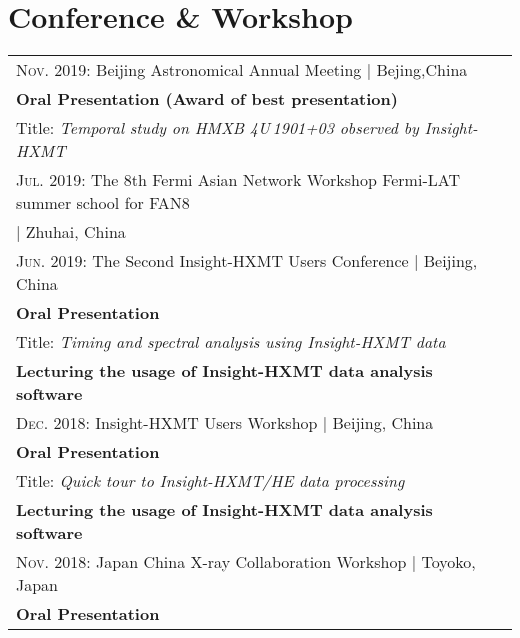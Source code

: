 \documentclass[a4paper,12pt]{article}
\begin{document}
\section{\textbf{Conference \& Workshop}}
\begin{tabular}{ll}
\textsc{Nov. } 2019: Beijing Astronomical Annual Meeting \hspace{4cm}| Bejing,China
\\ 
\hspace{2cm} \textbf{Oral Presentation (Award of best presentation)}
\\
\hspace{2cm} Title: \textit{Temporal study on HMXB 4U\,1901+03 observed by \textit{Insight}-HXMT} 
  \\
\textsc{Jul. } 2019: The 8th Fermi Asian Network Workshop  \footnotesize{Fermi-LAT summer school for FAN8} \\
\hspace{13.5cm}| Zhuhai, China\normalsize
\\
\textsc{Jun. } 2019: The Second Insight-HXMT Users Conference \hspace{2.7cm}| Beijing, China
\\
\hspace{2cm} \textbf{Oral Presentation} \normalsize\\
\hspace{2cm} Title: \textit{Timing and spectral analysis using Insight-HXMT data}\\
\hspace{2cm} \textbf{Lecturing the usage of Insight-HXMT data analysis software} \normalsize
\\
\textsc{Dec. } 2018: Insight-HXMT Users Workshop \hspace{5cm}| Beijing, China\\
\hspace{2cm} \textbf{Oral Presentation}\\
\hspace{2cm} Title: \textit{Quick tour to Insight-HXMT/HE data processing}\\
\hspace{2cm} \textbf{Lecturing the usage of Insight-HXMT data analysis software} \normalsize
\\
\textsc{Nov. } 2018: Japan China X-ray Collaboration Workshop \hspace{3cm}| Toyoko, Japan\\ 
\hspace{2cm} \textbf{Oral Presentation}\\

\end{tabular}
\end{document}
